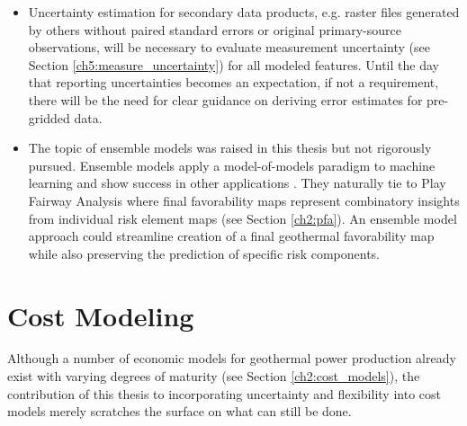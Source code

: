\begin{itemize}
    \item Uncertainty estimation for secondary data products, e.g. raster files generated by others without paired standard errors or original primary-source observations, will be necessary to evaluate measurement uncertainty (see Section \ref{ch5:measure_uncertainty}) for all modeled features. Until the day that reporting uncertainties becomes an expectation, if not a requirement, there will be the need for clear guidance on deriving error estimates for pre-gridded data.
    \item The topic of ensemble models was raised in this thesis but not rigorously pursued. Ensemble models apply a model-of-models paradigm to machine learning and show success in other applications \citep[e.g.,][]{wilson_machine_2020}. They naturally tie to Play Fairway Analysis where final favorability maps represent combinatory insights from individual risk element maps (see Section \ref{ch2:pfa}). An ensemble model approach could streamline creation of a final geothermal favorability map while also preserving the prediction of specific risk components.
\end{itemize}

\section{Cost Modeling}\label{ch9:future_work_cm}
Although a number of economic models for geothermal power production already exist with varying degrees of maturity (see Section \ref{ch2:cost_models}), the contribution of this thesis to incorporating uncertainty and flexibility into cost models merely scratches the surface on what can still be done.

